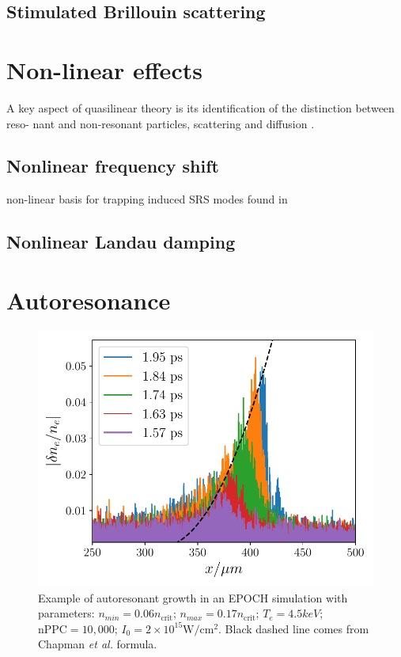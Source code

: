\subsection{Stimulated Brillouin scattering}


\section{Non-linear effects}
A key aspect of quasilinear theory is its identification of the distinction between reso-
nant and non-resonant particles, scattering and diffusion \citep{Sagdeev2018}.

\subsection{Nonlinear frequency shift}
non-linear basis for trapping induced SRS modes found in \cite{Rose2001}
\subsection{Nonlinear Landau damping}





\section{Autoresonance}

\begin{figure}[ht]
    \centering
    \includegraphics[width=0.8\columnwidth]{Chapters/C2_Theory/AR_diagnostic.pdf}
    \caption{Example of autoresonant growth in an EPOCH simulation with parameters: $n_{min} = 0.06 n_{\text{crit}}$; $n_{max} = 0.17 n_{\text{crit}}$; $T_e = 4.5\si{keV}$; $\text{nPPC}=10,000$; $I_0 = 2 \times 10^{15}\si{\watt / \centi\metre^2}$. Black dashed line comes from Chapman \textit{et al.} \citep{Chapman2012} formula.}
    \label{fig:AR_diagnostic}
\end{figure}{}

%
%
